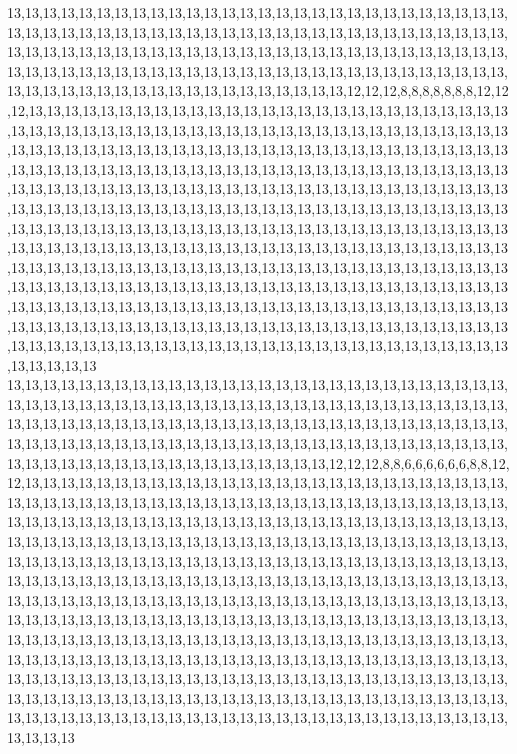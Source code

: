 13,13,13,13,13,13,13,13,13,13,13,13,13,13,13,13,13,13,13,13,13,13,13,13,13,13,13,13,13,13,13,13,13,13,13,13,13,13,13,13,13,13,13,13,13,13,13,13,13,13,13,13,13,13,13,13,13,13,13,13,13,13,13,13,13,13,13,13,13,13,13,13,13,13,13,13,13,13,13,13,13,13,13,13,13,13,13,13,13,13,13,13,13,13,13,13,13,13,13,13,13,13,13,13,13,13,13,13,13,13,13,13,13,13,13,13,13,13,13,13,13,13,13,13,13,13,13,13,13,13,13,12,12,12,8,8,8,8,8,8,8,12,12,12,13,13,13,13,13,13,13,13,13,13,13,13,13,13,13,13,13,13,13,13,13,13,13,13,13,13,13,13,13,13,13,13,13,13,13,13,13,13,13,13,13,13,13,13,13,13,13,13,13,13,13,13,13,13,13,13,13,13,13,13,13,13,13,13,13,13,13,13,13,13,13,13,13,13,13,13,13,13,13,13,13,13,13,13,13,13,13,13,13,13,13,13,13,13,13,13,13,13,13,13,13,13,13,13,13,13,13,13,13,13,13,13,13,13,13,13,13,13,13,13,13,13,13,13,13,13,13,13,13,13,13,13,13,13,13,13,13,13,13,13,13,13,13,13,13,13,13,13,13,13,13,13,13,13,13,13,13,13,13,13,13,13,13,13,13,13,13,13,13,13,13,13,13,13,13,13,13,13,13,13,13,13,13,13,13,13,13,13,13,13,13,13,13,13,13,13,13,13,13,13,13,13,13,13,13,13,13,13,13,13,13,13,13,13,13,13,13,13,13,13,13,13,13,13,13,13,13,13,13,13,13,13,13,13,13,13,13,13,13,13,13,13,13,13,13,13,13,13,13,13,13,13,13,13,13,13,13,13,13,13,13,13,13,13,13,13,13,13,13,13,13,13,13,13,13,13,13,13,13,13,13,13,13,13,13,13,13,13,13,13,13,13,13,13,13,13,13,13,13,13,13,13,13,13,13,13,13,13,13,13,13,13,13,13,13,13,13,13,13,13,13,13,13,13,13,13,13,13,13,13,13,13,13,13,13,13,13,13,13,13,13,13,13,13,13,13,13,13,13,13,13,13,13,13,13,13,13,13,13,13,13,13,13,13,13,13,13,13
13,13,13,13,13,13,13,13,13,13,13,13,13,13,13,13,13,13,13,13,13,13,13,13,13,13,13,13,13,13,13,13,13,13,13,13,13,13,13,13,13,13,13,13,13,13,13,13,13,13,13,13,13,13,13,13,13,13,13,13,13,13,13,13,13,13,13,13,13,13,13,13,13,13,13,13,13,13,13,13,13,13,13,13,13,13,13,13,13,13,13,13,13,13,13,13,13,13,13,13,13,13,13,13,13,13,13,13,13,13,13,13,13,13,13,13,13,13,13,13,13,13,13,13,13,13,13,13,13,13,12,12,12,8,8,6,6,6,6,6,6,8,8,12,12,13,13,13,13,13,13,13,13,13,13,13,13,13,13,13,13,13,13,13,13,13,13,13,13,13,13,13,13,13,13,13,13,13,13,13,13,13,13,13,13,13,13,13,13,13,13,13,13,13,13,13,13,13,13,13,13,13,13,13,13,13,13,13,13,13,13,13,13,13,13,13,13,13,13,13,13,13,13,13,13,13,13,13,13,13,13,13,13,13,13,13,13,13,13,13,13,13,13,13,13,13,13,13,13,13,13,13,13,13,13,13,13,13,13,13,13,13,13,13,13,13,13,13,13,13,13,13,13,13,13,13,13,13,13,13,13,13,13,13,13,13,13,13,13,13,13,13,13,13,13,13,13,13,13,13,13,13,13,13,13,13,13,13,13,13,13,13,13,13,13,13,13,13,13,13,13,13,13,13,13,13,13,13,13,13,13,13,13,13,13,13,13,13,13,13,13,13,13,13,13,13,13,13,13,13,13,13,13,13,13,13,13,13,13,13,13,13,13,13,13,13,13,13,13,13,13,13,13,13,13,13,13,13,13,13,13,13,13,13,13,13,13,13,13,13,13,13,13,13,13,13,13,13,13,13,13,13,13,13,13,13,13,13,13,13,13,13,13,13,13,13,13,13,13,13,13,13,13,13,13,13,13,13,13,13,13,13,13,13,13,13,13,13,13,13,13,13,13,13,13,13,13,13,13,13,13,13,13,13,13,13,13,13,13,13,13,13,13,13,13,13,13,13,13,13,13,13,13,13,13,13,13,13,13,13,13,13,13,13,13,13,13,13,13,13,13,13,13,13,13,13,13,13,13,13,13,13,13,13,13,13,13,13,13,13,13,13
